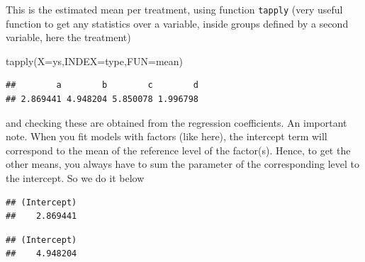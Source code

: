 \documentclass[
]{book}
\newenvironment{Shaded}{\begin{snugshade}}{\end{snugshade}}
\newcommand{\AttributeTok}[1]{\textcolor[rgb]{0.77,0.63,0.00}{#1}}
\newcommand{\CommentTok}[1]{\textcolor[rgb]{0.56,0.35,0.01}{\textit{#1}}}
\newcommand{\DecValTok}[1]{\textcolor[rgb]{0.00,0.00,0.81}{#1}}
\newcommand{\FunctionTok}[1]{\textcolor[rgb]{0.00,0.00,0.00}{#1}}
\newcommand{\NormalTok}[1]{#1}
\newcommand{\SpecialCharTok}[1]{\textcolor[rgb]{0.00,0.00,0.00}{#1}}
\begin{document}
This is the estimated mean per treatment, using function \texttt{tapply} (very useful function to get any statistics over a variable, inside groups defined by a second variable, here the treatment)

\begin{Shaded}
\begin{Highlighting}[]
\FunctionTok{tapply}\NormalTok{(}\AttributeTok{X=}\NormalTok{ys,}\AttributeTok{INDEX=}\NormalTok{type,}\AttributeTok{FUN=}\NormalTok{mean)}
\end{Highlighting}
\end{Shaded}

\begin{verbatim}
##        a        b        c        d 
## 2.869441 4.948204 5.850078 1.996798
\end{verbatim}

and checking these are obtained from the regression coefficients.
An important note. When you fit models with factors (like here), the intercept term will correspond to the mean of the reference level of the factor(s). Hence, to get the other means, you always have to sum the parameter of the corresponding level to the intercept. So we do it below

\begin{Shaded}
\end{Shaded}

\begin{verbatim}
## (Intercept) 
##    2.869441
\end{verbatim}

\begin{Shaded}
\end{Shaded}

\begin{verbatim}
## (Intercept) 
##    4.948204
\end{verbatim}

\begin{Shaded}
\end{Shaded}
\end{document}
